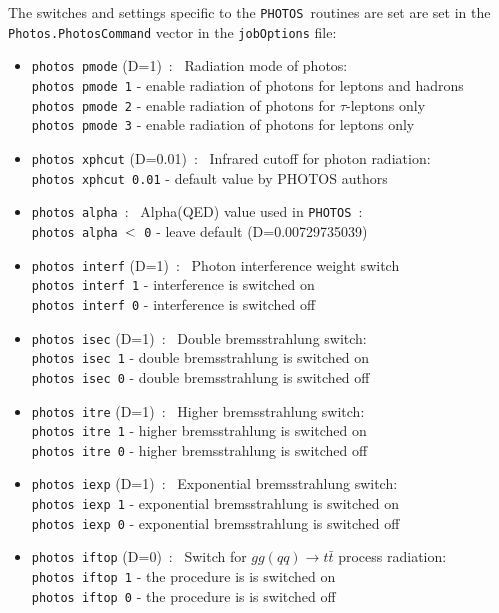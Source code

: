 \documentclass[a4paper,12pt]{article}
\newcommand{\photos}{{\tt PHOTOS }}
\begin{document}
\vspace{0.2cm}\noindent
The switches and settings specific to the \photos routines are set are set in the 
{\tt Photos.PhotosCommand} vector in the {\tt jobOptions} file:
\begin{itemize}
\item{\tt  photos pmode} (D=1)\ : \ Radiation mode of photos:\\
{\tt photos pmode 1} - enable radiation of photons for leptons and hadrons\\
{\tt photos pmode 2} - enable radiation of photons for $\tau$-leptons only\\
{\tt photos pmode 3} - enable radiation of photons for leptons only
\item{\tt  photos xphcut} (D=0.01)\ : \ Infrared cutoff for photon radiation:\\
{\tt photos xphcut 0.01} - default value by PHOTOS authors
\item{\tt  photos alpha}\ : \ Alpha(QED) value used in \photos:\\
{\tt photos alpha $\rm <$ 0} - leave default (D=0.00729735039)
\item{\tt  photos interf} (D=1)\ : \ Photon interference weight switch\\ 
{\tt photos interf 1} - interference is switched on\\
{\tt photos interf 0} - interference is switched off
\item{\tt  photos isec} (D=1)\ : \ Double bremsstrahlung switch:\\
{\tt photos isec 1} - double bremsstrahlung is switched on\\
{\tt photos isec 0} - double bremsstrahlung is switched off
\item{\tt  photos itre} (D=1)\ : \ Higher bremsstrahlung switch:\\
{\tt photos itre 1} - higher bremsstrahlung is switched on\\
{\tt photos itre 0} - higher bremsstrahlung is switched off
\item{\tt  photos iexp} (D=1)\ : \ Exponential bremsstrahlung switch:\\
{\tt photos iexp 1} - exponential bremsstrahlung is switched on\\
{\tt photos iexp 0} - exponential bremsstrahlung is switched off
\item{\tt  photos iftop} (D=0)\ : \ Switch for $gg(qq) \to t\bar{t}$ process radiation:\\ 
{\tt photos iftop 1} - the procedure is is switched on\\
{\tt photos iftop 0} - the procedure is is switched off
\end{itemize}
\end{document}
